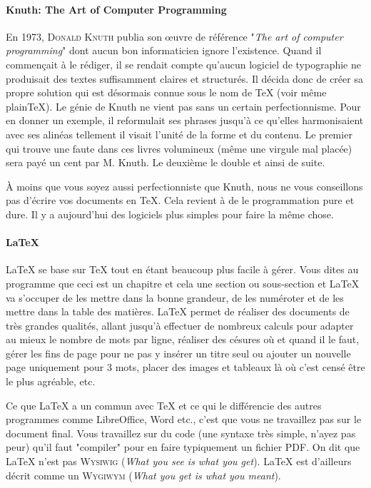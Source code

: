 




\vspace{.2cm}
\paragraph{Knuth: The Art of Computer Programming}
En 1973, \textsc{Donald Knuth} publia son \oe uvre de référence "\textit{The art of computer programming}" dont aucun bon informaticien ignore l'existence. Quand il commençait à le rédiger, il se rendait compte qu'aucun logiciel de typographie ne produisait des textes suffisamment claires et structurés. Il décida donc de créer sa propre solution qui est désormais connue sous le nom de \TeX{} (voir même plain\TeX). Le génie de Knuth ne vient pas sans un certain perfectionnisme. Pour en donner un exemple, il reformulait ses phrases jusqu'à ce qu'elles harmonisaient avec ses alinéas tellement il visait l'unité de la forme et du contenu.
Le premier qui trouve une faute dans ces livres volumineux (même une virgule mal placée) sera payé un cent par M. Knuth. Le deuxième le double et ainsi de suite.

À moins que vous soyez aussi perfectionniste que Knuth, nous ne vous conseillons pas d'écrire vos documents en \TeX. Cela revient à de le programmation pure et dure. Il y a aujourd'hui des logiciels plus simples pour faire la même chose.

\paragraph{LaTeX}
\LaTeX{} se base sur \TeX{} tout en étant beaucoup plus facile à gérer. Vous dites au programme que ceci est un chapitre et cela une section ou sous-section et \LaTeX{} va s'occuper de les mettre dans la bonne grandeur, de les numéroter et de les mettre dans la table des matières. \LaTeX{} permet de réaliser des documents de très grandes qualités, allant jusqu'à effectuer de nombreux calculs pour adapter au mieux le nombre de mots par ligne, réaliser des césures où et quand il le faut, gérer les fins de page pour ne pas y insérer un titre seul ou ajouter un nouvelle page uniquement pour 3 mots, placer des images et tableaux là où c'est censé être le plus agréable, etc.

Ce que \LaTeX{} a un commun avec \TeX{} et ce qui le différencie des autres programmes comme LibreOffice, Word etc., c'est que vous ne travaillez pas sur le document final. Vous travaillez sur du code (une syntaxe très simple, n'ayez pas peur) qu'il faut "compiler" pour en faire typiquement un fichier PDF. On dit que \LaTeX{} n'est pas \textsc{Wysiwig} (\textit{What you see is what you get}). %
\LaTeX{} est d'ailleurs décrit comme un \textsc{Wygiwym} (\textit{What you get is what you meant}).

